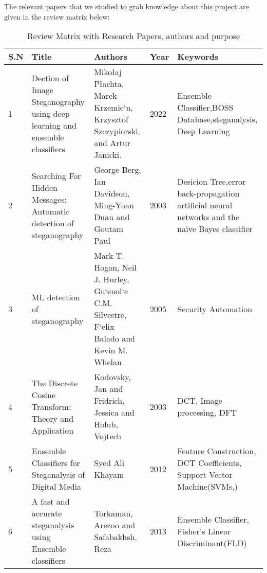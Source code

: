 The relevant papers that we studied to grab knowledge about this project are given in the review matrix below:

 \begin{table}[h!]
    \begin{tabular}{|p{2.5cm}|p{2.5cm}|p{2.5cm}|p{2.5cm}|p{4cm}|}
    \hline
    S.N& Title& Authors& Year & Keywords\\
    \hline
    1&Dection of Image Steganography using deep learning and ensemble classifiers&Mikołaj Płachta, Marek Krzemie`n, Krzysztof Szczypiorski, and Artur Janicki.&2022& Ensemble Classifier,BOSS Database,steganalysis, Deep Learning\\
    \hline
    2&Searching For Hidden Messages: Automatic detection of steganography&George Berg, Ian Davidson, Ming-Yuan Duan and Goutam Paul&2003& Desicion Tree,error back-propagation artificial neural networks and the naïve Bayes classifier\\
    \hline
    3&ML detection of steganography&Mark T. Hogan, Neil J. Hurley, Gu`enol`e C.M. Silvestre, F`elix Balado and Kevin M. Whelan&2005&Security Automation\\
    \hline
    4&The Discrete Cosine Transform: Theory and Application&Kodovsky, Jan and Fridrich, Jessica and Holub, Vojtech&2003&DCT, Image processing, DFT\\
    \hline
    5&Ensemble Classifiers for Steganalysis of Digital Media&Syed Ali Khayam&2012&Feature Construction, DCT Coefficients, Support Vector Machine(SVMs,)\\
    \hline
    6&A fast and accurate steganalysis using Ensemble classifiers &Torkaman, Arezoo and Safabakhsh, Reza&2013&Ensemble Classifier, Fisher's Linear Discriminant(FLD)\\
    \hline
    \end{tabular}
    \caption{Review Matrix with Research Papers, authors and purpose}
\end{table}
